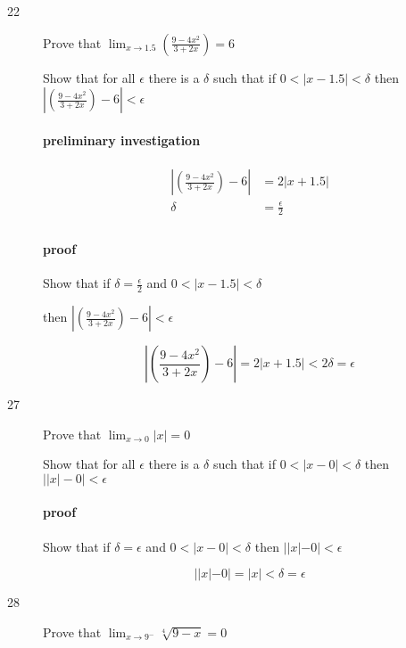 \documentclass[letterpaper, landscape]{exam}
\begin{document}
\begin{description}
      \newpage

      \item[22] Prove that $\lim_{x \to 1.5} \left( \frac{9 - 4x^2}{3 + 2x} \right) = 6$

        Show that for all $\epsilon$ there is a $\delta$ such that if 
        $0 < |x - 1.5| < \delta$ then 
        $\left| \left( \frac{9 - 4x^2}{3 + 2x} \right) - 6 \right| < \epsilon$

        \paragraph{preliminary investigation}
        \begin{align*}
          \left| \left( \frac{9 - 4x^2}{3 + 2x} \right) - 6 \right| & = 2 |x + 1.5| \\
          \delta                                                    & = \frac{\epsilon}{2} \\
        \end{align*}

        \paragraph{proof}
        Show that if $\delta = \frac{\epsilon}{2}$ and $0 < |x - 1.5| < \delta$

        then $\left| \left( \frac{9 - 4x^2}{3 + 2x} \right) - 6 \right| < \epsilon$

        \[
          \left| \left( \frac{9 - 4x^2}{3 + 2x} \right) - 6 \right| 
            = 2 |x + 1.5| < 2 \delta = \epsilon
        \]

      \item[27] Prove that $\lim_{x \to 0} |x| = 0$

        Show that for all $\epsilon$ there is a $\delta$ such that if 
        $0 < |x - 0| < \delta$ then $ \left| |x| - 0 \right| < \epsilon$

        \paragraph{proof}
        Show that if $\delta = \epsilon$ and $0 < |x - 0| < \delta$
        then $| |x| - 0| < \epsilon$

        \[
          | |x| - 0| = |x| < \delta = \epsilon
        \]

      \item[28] Prove that $\lim_{x \to 9^-} \sqrt[4]{9 - x} = 0$


\end{description}
\end{document}
